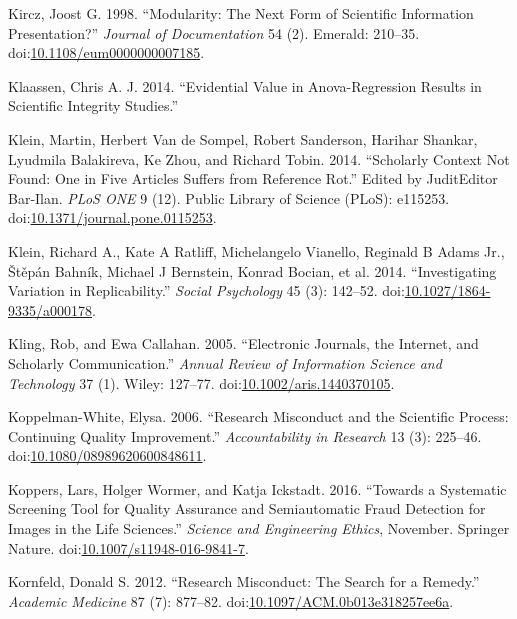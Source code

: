 \documentclass[a5paper]{book}
\begin{document}
\hypertarget{ref-doi:10.1108ux2feum0000000007185}{}
Kircz, Joost G. 1998. ``Modularity: The Next Form of Scientific
Information Presentation?'' \emph{Journal of Documentation} 54 (2).
Emerald: 210--35.
doi:\href{https://doi.org/10.1108/eum0000000007185}{10.1108/eum0000000007185}.

\hypertarget{ref-klaassen2014evidential}{}
Klaassen, Chris A. J. 2014. ``Evidential Value in Anova-Regression
Results in Scientific Integrity Studies.''

\hypertarget{ref-doi:10.1371ux2fjournal.pone.0115253}{}
Klein, Martin, Herbert Van de Sompel, Robert Sanderson, Harihar Shankar,
Lyudmila Balakireva, Ke Zhou, and Richard Tobin. 2014. ``Scholarly
Context Not Found: One in Five Articles Suffers from Reference Rot.''
Edited by JuditEditor Bar-Ilan. \emph{PLoS ONE} 9 (12). Public Library
of Science (PLoS): e115253.
doi:\href{https://doi.org/10.1371/journal.pone.0115253}{10.1371/journal.pone.0115253}.

\hypertarget{ref-doi:10.1027ux2f1864-9335ux2fa000178}{}
Klein, Richard A., Kate A Ratliff, Michelangelo Vianello, Reginald B
Adams Jr., Štěpán Bahník, Michael J Bernstein, Konrad Bocian, et al.
2014. ``Investigating Variation in Replicability.'' \emph{Social
Psychology} 45 (3): 142--52.
doi:\href{https://doi.org/10.1027/1864-9335/a000178}{10.1027/1864-9335/a000178}.

\hypertarget{ref-doi:10.1002ux2faris.1440370105}{}
Kling, Rob, and Ewa Callahan. 2005. ``Electronic Journals, the Internet,
and Scholarly Communication.'' \emph{Annual Review of Information
Science and Technology} 37 (1). Wiley: 127--77.
doi:\href{https://doi.org/10.1002/aris.1440370105}{10.1002/aris.1440370105}.

\hypertarget{ref-doi:10.1080ux2f08989620600848611}{}
Koppelman-White, Elysa. 2006. ``Research Misconduct and the Scientific
Process: Continuing Quality Improvement.'' \emph{Accountability in
Research} 13 (3): 225--46.
doi:\href{https://doi.org/10.1080/08989620600848611}{10.1080/08989620600848611}.

\hypertarget{ref-doi:10.1007ux2fs11948-016-9841-7}{}
Koppers, Lars, Holger Wormer, and Katja Ickstadt. 2016. ``Towards a
Systematic Screening Tool for Quality Assurance and Semiautomatic Fraud
Detection for Images in the Life Sciences.'' \emph{Science and
Engineering Ethics}, November. Springer Nature.
doi:\href{https://doi.org/10.1007/s11948-016-9841-7}{10.1007/s11948-016-9841-7}.

\hypertarget{ref-doi:10.1097ux2fACM.0b013e318257ee6a}{}
Kornfeld, Donald S. 2012. ``Research Misconduct: The Search for a
Remedy.'' \emph{Academic Medicine} 87 (7): 877--82.
doi:\href{https://doi.org/10.1097/ACM.0b013e318257ee6a}{10.1097/ACM.0b013e318257ee6a}.
\end{document}
